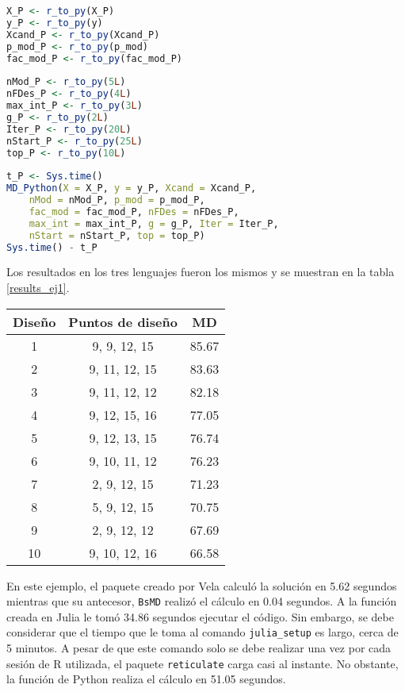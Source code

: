 \begin{lstlisting}[language=R]
X_P <- r_to_py(X_P)
y_P <- r_to_py(y) 
Xcand_P <- r_to_py(Xcand_P)
p_mod_P <- r_to_py(p_mod)
fac_mod_P <- r_to_py(fac_mod_P)
	
nMod_P <- r_to_py(5L)
nFDes_P <- r_to_py(4L)
max_int_P <- r_to_py(3L)
g_P <- r_to_py(2L)
Iter_P <- r_to_py(20L)
nStart_P <- r_to_py(25L)
top_P <- r_to_py(10L)
	
t_P <- Sys.time()
MD_Python(X = X_P, y = y_P, Xcand = Xcand_P, 
	nMod = nMod_P, p_mod = p_mod_P, 
	fac_mod = fac_mod_P, nFDes = nFDes_P, 
	max_int = max_int_P, g = g_P, Iter = Iter_P, 
	nStart = nStart_P, top = top_P)
Sys.time() - t_P
\end{lstlisting}

Los resultados en los tres lenguajes fueron los mismos y se muestran en la tabla \ref{results_ej1}. 

\begin{center}
	\begin{tabular}{cc|c}
		Diseño & Puntos de diseño & MD \\
		\hline
		1 & 9, 9, 12, 15 & 85.67 \\
		
		2 & 9, 11, 12, 15 & 83.63 \\
		
		3 &  9, 11, 12, 12 & 82.18 \\
		
		4 & 9, 12, 15, 16 & 77.05 \\
		
		5 & 9, 12, 13, 15 & 76.74 \\
		
		6 & 9, 10, 11, 12 & 76.23 \\
		
		7 & 2, 9, 12, 15 & 71.23 \\
		
		8 & 5, 9, 12, 15 & 70.75 \\
		
		9 & 2, 9, 12, 12 & 67.69 \\
		
		10 & 9, 10, 12, 16 & 66.58 \\
		
	\end{tabular}
	 \label{results_ej1}
\end{center}

En este ejemplo, el paquete creado por Vela calculó la solución en 5.62 segundos mientras que su antecesor, \texttt{BsMD} realizó el cálculo en 0.04 segundos. A la función creada en \textsf{Julia} le tomó 34.86 segundos ejecutar el código. Sin embargo, se debe considerar que el tiempo que le toma al comando \texttt{julia\_setup} es largo, cerca de 5 minutos. A pesar de que este comando solo se debe realizar una vez por cada sesión de \textsf{R} utilizada, el paquete \texttt{reticulate} carga casi al instante. No obstante, la función de \textsf{Python} realiza el cálculo en 51.05 segundos.  

